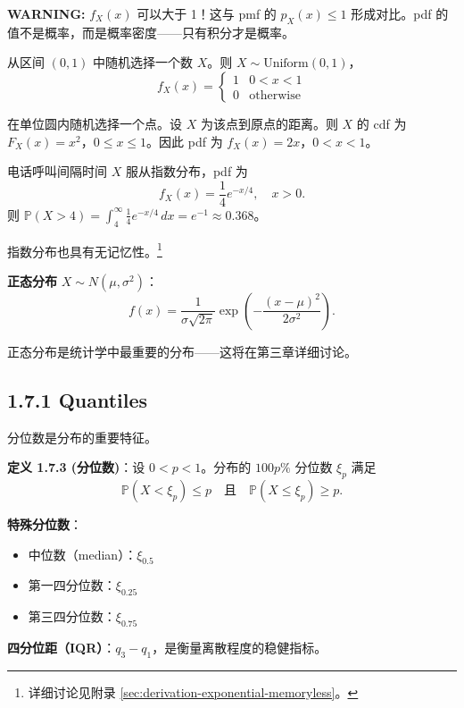\textbf{WARNING:} $f_X(x)$ 可以大于 1！这与 pmf 的 $p_X(x) \leq 1$ 形成对比。pdf 的值不是概率，而是概率密度——只有积分才是概率。

\begin{example}[均匀分布]\label{ex:uniform-cont-ch1}
从区间 $(0, 1)$ 中随机选择一个数 $X$。则 $X \sim \text{Uniform}(0, 1)$，
\[
f_X(x) = \begin{cases} 1 & 0 < x < 1 \\ 0 & \text{otherwise} \end{cases}
\]
\end{example}

\begin{example}[单位圆内的随机点]\label{ex:unit-circle-ch1}
在单位圆内随机选择一个点。设 $X$ 为该点到原点的距离。则 $X$ 的 cdf 为 $F_X(x) = x^2$，$0 \leq x \leq 1$。因此 pdf 为 $f_X(x) = 2x$，$0 < x < 1$。
\end{example}

\begin{example}[指数分布]\label{ex:exponential-ch1}
电话呼叫间隔时间 $X$ 服从指数分布，pdf 为
\[
f_X(x) = \frac{1}{4} e^{-x/4}, \quad x > 0.
\]
则 $\mathbb{P}(X > 4) = \int_4^\infty \frac{1}{4} e^{-x/4} \, dx = e^{-1} \approx 0.368$。

指数分布也具有无记忆性。\footnote{详细讨论见附录 \cref{sec:derivation-exponential-memoryless}。}
\end{example}

\textbf{正态分布} $X \sim N(\mu, \sigma^2)$：
\[
f(x) = \frac{1}{\sigma\sqrt{2\pi}} \exp\left(-\frac{(x-\mu)^2}{2\sigma^2}\right).
\label{eq:normal-pdf-ch1}
\]

正态分布是统计学中最重要的分布——这将在第三章详细讨论。

\subsection{1.7.1 Quantiles}

分位数是分布的重要特征。

\begin{remark}
\textbf{定义 1.7.3 (分位数)}：设 $0 < p < 1$。分布的 $100p\%$ 分位数 $\xi_p$ 满足
\[
\mathbb{P}(X < \xi_p) \leq p \quad \text{且} \quad \mathbb{P}(X \leq \xi_p) \geq p.
\label{eq:quantile-def-ch1}
\]

\textbf{特殊分位数}：
\begin{itemize}
    \item 中位数（median）：$\xi_{0.5}$
    \item 第一四分位数：$\xi_{0.25}$
    \item 第三四分位数：$\xi_{0.75}$
\end{itemize}

\textbf{四分位距（IQR）}：$q_3 - q_1$，是衡量离散程度的稳健指标。
\end{remark}

